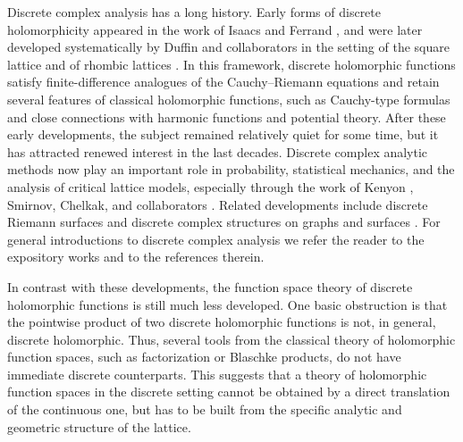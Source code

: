 \documentclass[12pt,a4paper,reqno]{amsart}
\theoremstyle{definition}
\theoremstyle{definition}\newtheorem{defn}[thm]{Definition}
\begin{document}
    Discrete complex analysis has a long history. Early forms of discrete
    holomorphicity appeared in the work of Isaacs \cite{Isa41,Isa52} and Ferrand
    \cite{F}, and were later developed systematically by Duffin and
    collaborators in the setting of the square lattice and of rhombic lattices
    \cite{D,Duf68,DP68}. In this framework, discrete holomorphic functions
    satisfy finite-difference analogues of the Cauchy--Riemann equations and retain
    several features of classical holomorphic functions, such as Cauchy-type
    formulas and close connections with harmonic functions and potential theory.
    After these early developments, the subject remained relatively quiet for some
    time, but it has attracted renewed interest in the last decades. Discrete
    complex analytic methods now play an important role in probability, statistical
    mechanics, and the analysis of critical lattice models, especially through the
    work of Kenyon \cite{Ken02}, Smirnov, Chelkak, and collaborators
    \cite{CS11,CS12,Che16,CLR23}. Related developments include discrete Riemann
    surfaces and discrete complex structures on graphs and surfaces
    \cite{Mer01,Mer08,BG16,Sko13}. For general introductions to discrete complex
    analysis we refer the reader to the expository works \cite{Lov04,Smi10} and to
    the references therein.
    
    In contrast with these developments, the function space theory of discrete
    holomorphic functions is still much less developed. One basic obstruction is
    that the pointwise product of two discrete holomorphic functions is not, in
    general, discrete holomorphic. Thus, several tools from the classical theory of holomorphic function spaces, such as factorization or Blaschke products, do not have
    immediate discrete counterparts. This suggests that a theory of holomorphic function spaces in the discrete setting cannot be obtained by a direct
    translation of the continuous one, but has to be built from the specific
    analytic and geometric structure of the lattice. 
    
\end{document}

